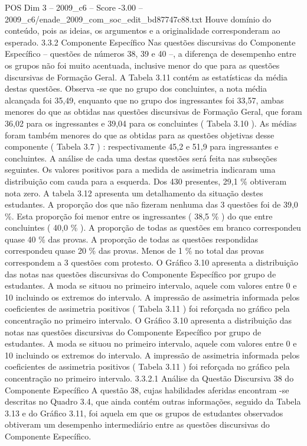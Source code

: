 \begin{textsample}{POS Dim 3 – 2009\_c6 – Score -3.00 – 2009\_c6/enade\_2009\_com\_soc\_edit\_bd87747c88.txt}
Houve domínio do conteúdo, pois as ideias, os argumentos e a originalidade corresponderam ao esperado. 3.3.2 Componente Específico Nas questões discursivas do Componente Específico – questões de números 38, 39 e 40 –, a diferença de desempenho entre os grupos não foi muito acentuada, inclusive menor do que para as questões discursivas de Formação Geral.
A Tabela 3.11 contém as estatísticas da média destas questões.
Observa -se que no grupo dos concluintes, a nota média alcançada foi 35,49, enquanto que no grupo dos ingressantes foi 33,57, ambas menores do que as obtidas nas questões discursivas de Formação Geral, que foram 36,02 para os ingressantes e 39,04 para os concluintes ( Tabela 3.10 ).
As médias foram também menores do que as obtidas para as questões objetivas desse componente ( Tabela 3.7 ) : respectivamente 45,2 e 51,9 para ingressantes e concluintes.
A análise de cada uma destas questões será feita nas subseções seguintes.
Os valores positivos para a medida de assimetria indicaram uma distribuição com cauda para a esquerda.
Dos 430 presentes, 29,1 \% obtiveram nota zero.
A tabela 3.12 apresenta um detalhamento da situação destes estudantes.
A proporção dos que não fizeram nenhuma das 3 questões foi de 39,0 \%.
Esta proporção foi menor entre os ingressantes ( 38,5 \% ) do que entre concluintes ( 40,0 \% ).
A proporção de todas as questões em branco correspondeu quase 40 \% das provas.
A proporção de todas as questões respondidas correspondeu quase 20 \% das provas.
Menos de 1 \% no total das provas correspondem a 3 questões com protesto.
O Gráfico 3.10 apresenta a distribuição das notas nas questões discursivas do Componente Específico por grupo de estudantes.
A moda se situou no primeiro intervalo, aquele com valores entre 0 e 10 incluindo os extremos do intervalo.
A impressão de assimetria informada pelos coeficientes de assimetria positivos ( Tabela 3.11 ) foi reforçada no gráfico pela concentração no primeiro intervalo.
O Gráfico 3.10 apresenta a distribuição das notas nas questões discursivas do Componente Específico por grupo de estudantes.
A moda se situou no primeiro intervalo, aquele com valores entre 0 e 10 incluindo os extremos do intervalo.
A impressão de assimetria informada pelos coeficientes de assimetria positivos ( Tabela 3.11 ) foi reforçada no gráfico pela concentração no primeiro intervalo. 3.3.2.1 Análise da Questão Discursiva 38 do Componente Específico A questão 38, cujas habilidades aferidas encontram -se descritas no Quadro 3.4, que ainda contém outras informações, seguido da Tabela 3.13 e do Gráfico 3.11, foi aquela em que os grupos de estudantes observados obtiveram um desempenho intermediário entre as questões discursivas do Componente Específico.

\end{textsample}
